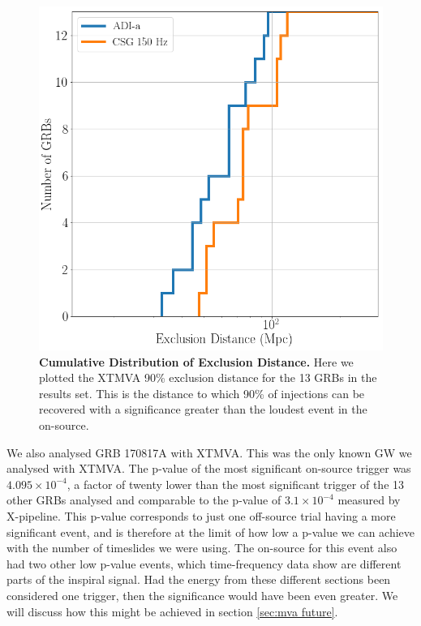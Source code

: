 \documentclass[11pt]{cuthesis}
\newcommand{\xpfs}{X-pipeline. }
\begin{document}
\begin{figure} %
\begin{center}
\includegraphics[width=0.8\linewidth]{mva_exclusion_plot.png}
\end{center}
\caption{\textbf{Cumulative Distribution of Exclusion Distance.} Here we plotted the XTMVA 90\% exclusion distance for the 13 GRBs in the results set. This is the distance to which 90\% of injections can be recovered with a significance greater than the loudest event in the on-source. }
\label{fig:mva exclusion plot}
\end{figure}

We also analysed GRB 170817A with XTMVA. This was the only known GW we analysed with XTMVA. The p-value of the most significant on-source trigger was $4.095\times10^{-4}$, a factor of twenty lower than the most significant trigger of the 13 other GRBs analysed and comparable to the p-value of $3.1\times10^{-4}$ measured by \xpfs This p-value corresponds to just one off-source trial having a more significant event, and is therefore at the limit of how low a p-value we can achieve with the number of timeslides we were using. The on-source for this event also had two other low p-value events, which time-frequency data show are different parts of the inspiral signal. Had the energy from these different sections been considered one trigger, then the significance would have been even greater. We will discuss how this might be achieved in section \ref{sec:mva future}. 
\end{document}

